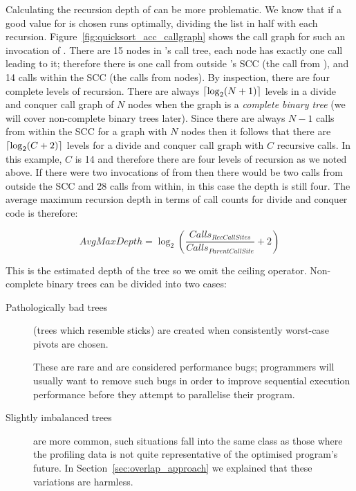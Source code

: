 Calculating the recursion depth of \quicksortacc can be more
problematic.
We know that if a good value for  is chosen \quicksortacc runs
optimally,
dividing the list in half with each recursion.
Figure~\ref{fig:quicksort_acc_callgraph} shows the call graph for such an
invocation of \quicksortacc.
There are 15 nodes in 's call tree,
each node has exactly one call leading to it;
therefore there is one call from outside \quicksortacc's SCC
(the call from ),
and 14 calls within the SCC
(the calls from  nodes).
By inspection, there are four complete levels of recursion.
There are always
$\lceil\log_2(N+1)\rceil$
levels in a divide and conquer call graph of $N$ nodes when
the graph is a \emph{complete binary tree}
(we will cover non-complete binary trees later).
Since there are always $N-1$ calls from within the SCC for a graph with
$N$ nodes then it follows that
there are $\lceil\log_2(C+2)\rceil$ levels for a divide and conquer call graph
with $C$ recursive calls.
In this example, $C$ is 14 and therefore there are four levels of recursion
as we noted above.
If there were two invocations of \quicksortacc from  then there
would be two calls from outside the SCC and 28 calls from within,
in this case the depth is still four.
The average maximum recursion depth in terms of call counts for divide and
conquer code is therefore:

\begin{equation*}
AvgMaxDepth = \log_2
	\left(\frac{Calls_{RecCallSites}}{Calls_{ParentCallSite}} + 2\right)
\end{equation*}

\noindent
This is the estimated depth of the tree so we omit the ceiling operator.
Non-complete binary trees can be divided into two cases:

\begin{description}
    \item[Pathologically bad trees] (trees which resemble sticks)
    are created when consistently worst-case pivots are chosen.

    These are rare and are considered performance bugs;
    programmers will usually want to remove such bugs in order to improve
    sequential execution performance before they attempt to parallelise
    their program.

    \item[Slightly imbalanced trees] are more common,
    such situations fall into the same class as those where the profiling
    data is not quite representative of the optimised program's future.
    In Section~\ref{sec:overlap_approach} we explained that these variations
    are harmless.
\end{description}


